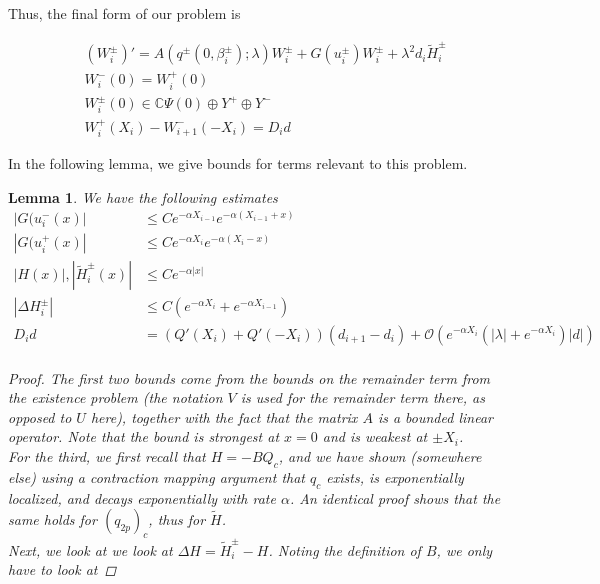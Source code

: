 \documentclass[12pt]{article}
\def\C{{\mathbb C}}
\newtheorem{lemma}{Lemma}
\begin{document}
Thus, the final form of our problem is

\begin{align}
&(W_i^\pm)' = A(q^\pm(0, \beta_i^\pm); \lambda) W_i^\pm + G(u_i^\pm) W_i^\pm + \lambda^2 d_i \tilde{H}_i^\pm \\
&W_i^-(0) = W_i^+(0) \\
&W_i^\pm(0) \in \C \Psi(0) \oplus Y^+ \oplus Y^- \\
&W_i^+(X_i) - W_{i+1}^-(-X_i) = D_i d
\end{align}

In the following lemma, we give bounds for terms relevant to this problem.


\begin{lemma}\label{problembounds}
We have the following estimates
\begin{align*}
|G(u_i^-(x)| &\leq C e^{-\alpha X_{i-1}} e^{-\alpha(X_{i-1} + x) } \\
|G(u_i^+(x)| &\leq C e^{-\alpha X_i} e^{-\alpha(X_i - x) } \\
|H(x)|, |\tilde{H}_i^\pm(x)| &\leq C e^{-\alpha |x|} \\
|\Delta H_i^\pm| &\leq C(e^{-\alpha X_i} + e^{-\alpha X_{i-1}} ) \\
D_i d &= ( Q'(X_i) + Q'(-X_i))(d_{i+1} - d_i ) + \mathcal{O} \left( e^{-\alpha X_i} \left( |\lambda| +  e^{-\alpha X_i}  \right) |d| \right) \\
\end{align*}

\begin{proof}
The first two bounds come from the bounds on the remainder term from the existence problem (the notation $V$ is used for the remainder term there, as opposed to $U$ here), together with the fact that the matrix $A$ is a bounded linear operator. Note that the bound is strongest at $x = 0$ and is weakest at $\pm X_i$. \\

For the third, we first recall that $H = -B Q_c$, and we have shown (somewhere else) using a contraction mapping argument that $q_c$ exists, is exponentially localized, and decays exponentially with rate $\alpha$. An identical proof shows that the same holds for $(q_{2p})_c$, thus for $\tilde{H}$.\\
 
Next, we look at we look at $\Delta H = \tilde{H}_i^\pm - H$. Noting the definition of $B$, we only have to look at 


\end{proof}
\end{lemma}
\end{document}
